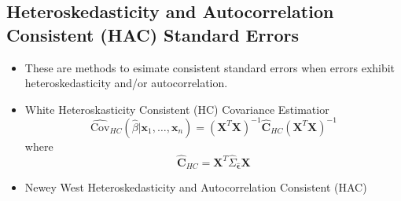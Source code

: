 \documentclass[11pt]{article}
\begin{document}
\subsection{Heteroskedasticity and Autocorrelation Consistent (HAC) Standard Errors}
\begin{itemize}
    \item These are methods to esimate consistent standard errors when errors exhibit 
    heteroskedasticity and/or autocorrelation.
    \item White Heteroskasticity Consistent (HC) Covariance Estimatior
    \[
    \hat{\text{Cov}}_{HC} (\hat{\beta} | \boldsymbol{x}_1, \ldots, \boldsymbol{x}_n) = 
    {(\boldsymbol{X}^T \boldsymbol{X})}^{-1} \hat{\boldsymbol{C}}_{HC} {(\boldsymbol{X}^T 
    \boldsymbol{X})}^{-1}
    \]
    where 
    \[
    \hat{\boldsymbol{C}}_{HC} = \boldsymbol{X}^T \hat{\Sigma}_{\hat{\boldsymbol{\epsilon}}}
    \boldsymbol{X}
    \]
    \item Newey West Heteroskedasticity and Autocorrelation Consistent (HAC)
\end{itemize}
\end{document}
